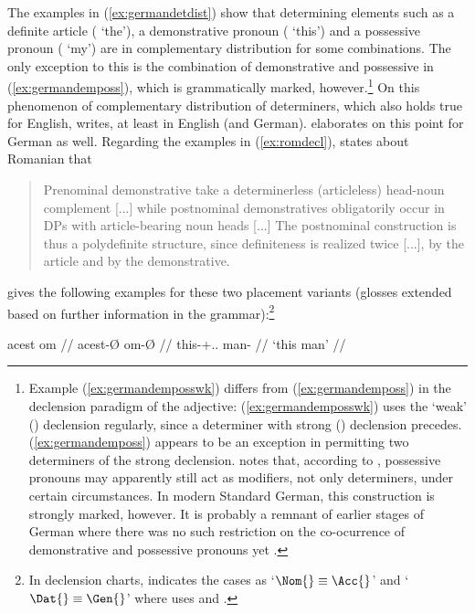 The examples in (\ref{ex:germandetdist}) show that determining elements such as
a definite article ( `the'), a demonstrative pronoun (
`this') and a possessive pronoun ( `my') are in complementary
distribution for some combinations. The only exception to this is the
combination of demonstrative and possessive in (\ref{ex:germandemposs}), which
is grammatically marked, however.\footnote{Example (\ref{ex:germandemposswk})
differs from (\ref{ex:germandemposs}) in the declension paradigm of the
adjective: (\ref{ex:germandemposswk}) uses the `weak' (\Wk) declension
regularly, since a determiner with strong (\St) declension precedes.
(\ref{ex:germandemposs}) appears to be an exception in permitting two
determiners of the strong declension. \citet[160--161, 203--205]{demske2001}
notes that, according to \citet{plank1992}, possessive pronouns may apparently
still act as modifiers, not only determiners, under certain circumstances. In
modern Standard German, this construction is strongly marked, however. It is
probably a remnant of earlier stages of German where there was no such
restriction on the co-ocurrence of demonstrative and possessive pronouns yet
\citep[173]{demske2001}.} On this phenomenon of complementary distribution of
determiners, which also holds true for English, \citet[208]{carnie2013} writes,
 at least in English
(and German). \citet[9--22]{demske2001} elaborates on this point for German as
well. Regarding the examples in (\ref{ex:romdecl}), \citet{dindelegan2013}
states about Romanian that

\blockcquote[297]{dindelegan2013}{Prenominal demonstrative \sic{} take a
determinerless (articleless) head-noun complement [...] while postnominal
demonstratives obligatorily occur in DPs with article-bearing noun heads [...]
The postnominal construction is thus a polydefinite structure, since
definiteness is realized twice [...], by the article and by the demonstrative.}

\citet[297]{dindelegan2013} gives the following examples for these two
placement variants (glosses extended based on further information in the
grammar):\footnote{In declension charts, \citet{dindelegan2013} indicates the
cases as `$\Nom{}\equiv\Acc{}$' and `$\Dat{}\equiv\Gen{}$' where
\citet{lyons1999} uses \Pri{} and \Obl{}.}

\pex
	\a {}%
	\begingl
		\gla acest om //
		\glb acest-Ø om-Ø //
		\glc this-\Nom{}+\Acc{}.\Sg{}.\M{} man-\Sg{} //
		\glft `this man' //
	\endgl

